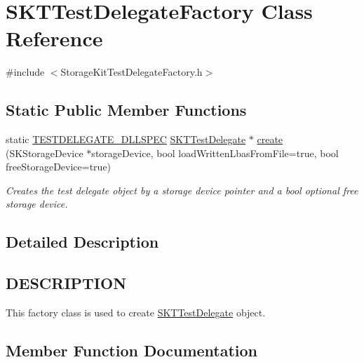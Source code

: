 \hypertarget{class_s_k_t_test_delegate_factory}{}\section{S\+K\+T\+Test\+Delegate\+Factory Class Reference}
\label{class_s_k_t_test_delegate_factory}


{\ttfamily \#include $<$Storage\+Kit\+Test\+Delegate\+Factory.\+h$>$}

\subsection*{Static Public Member Functions}
\begin{DoxyCompactItemize}
\item 
static \mbox{\hyperlink{defines_8h_a0304d37d6cebb46e900420b3caedcd16}{T\+E\+S\+T\+D\+E\+L\+E\+G\+A\+T\+E\+\_\+\+D\+L\+L\+S\+P\+EC}} \mbox{\hyperlink{class_s_k_t_test_delegate}{S\+K\+T\+Test\+Delegate}} $\ast$ \mbox{\hyperlink{class_s_k_t_test_delegate_factory_a6e33ab5a7ecc0f65e2977a248d75ae8b}{create}} (S\+K\+Storage\+Device $\ast$storage\+Device, bool load\+Written\+Lbas\+From\+File=true, bool free\+Storage\+Device=true)
\begin{DoxyCompactList}\small\item\em Creates the test delegate object by a storage device pointer and a bool optional free storage device. \end{DoxyCompactList}\end{DoxyCompactItemize}


\subsection{Detailed Description}
\hypertarget{class_s_k_t_test_delegate_factory_DESCRIPTION}{}\subsection{D\+E\+S\+C\+R\+I\+P\+T\+I\+ON}\label{class_s_k_t_test_delegate_factory_DESCRIPTION}
This factory class is used to create \mbox{\hyperlink{class_s_k_t_test_delegate}{S\+K\+T\+Test\+Delegate}} object. 

\subsection{Member Function Documentation}
\mbox{\label{class_s_k_t_test_delegate_factory_a6e33ab5a7ecc0f65e2977a248d75ae8b}} 
